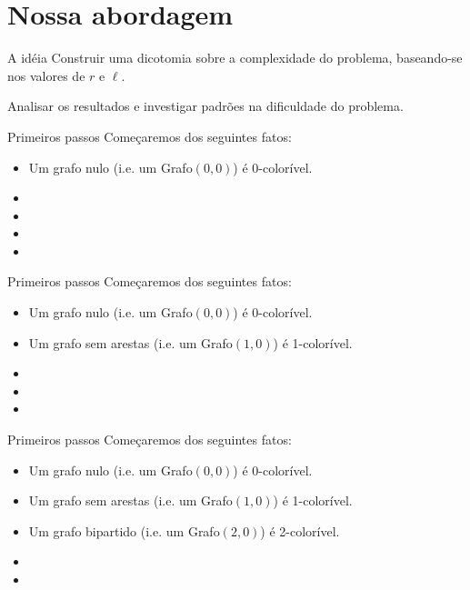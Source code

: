 \documentclass[9pt, compress]{beamer}
\newcommand{\?}{\textcolor{warn}{\textit{?}}}
\begin{document}
    \section{Nossa abordagem}
    \begin{frame}{A idéia}
      Construir uma dicotomia sobre a complexidade do problema, baseando-se nos valores de $r$ e $\ell$.
      
      Analisar os resultados e investigar padrões na dificuldade do problema.
    \end{frame}
    \begin{frame}{Primeiros passos}
      Começaremos dos seguintes fatos:
      \begin{itemize}
        \item Um grafo nulo (i.e. um Grafo$(0,0)$) é 0-colorível.
        \item 
        \item 
        \item 
         \item                                                                                                                
      \end{itemize}
    \end{frame}
    \begin{frame}{Primeiros passos}
      Começaremos dos seguintes fatos:
      \begin{itemize}
        \item Um grafo nulo (i.e. um Grafo$(0,0)$) é 0-colorível.
        \item Um grafo sem arestas (i.e. um Grafo$(1,0)$) é 1-colorível.
        \item 
        \item 
         \item                                                                                                                
      \end{itemize}
    \end{frame}
    \begin{frame}{Primeiros passos}
      Começaremos dos seguintes fatos:
      \begin{itemize}
        \item Um grafo nulo (i.e. um Grafo$(0,0)$) é 0-colorível.
        \item Um grafo sem arestas (i.e. um Grafo$(1,0)$) é 1-colorível.
        \item Um grafo bipartido (i.e. um Grafo$(2,0)$) é 2-colorível.
        \item 
         \item                                                                                                                
      \end{itemize}
    \end{frame}
\end{document}
